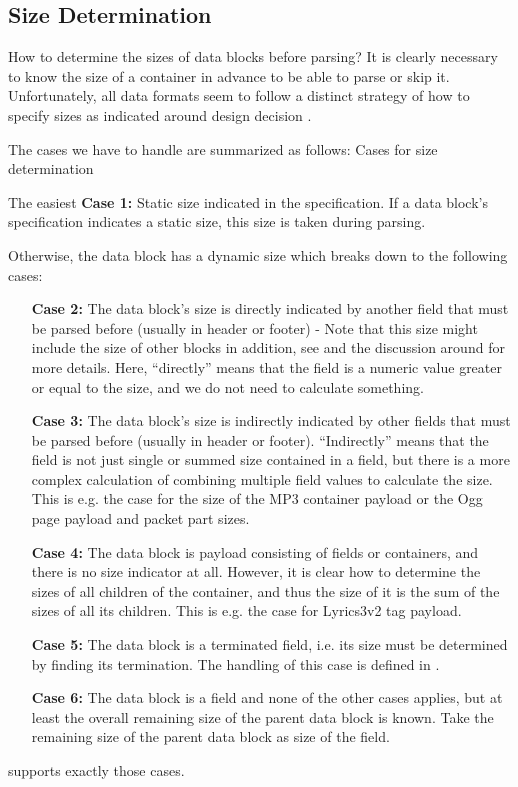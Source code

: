 \subsection{Size Determination}%
\label{sec:SizeDetermination}%

How to determine the sizes of data blocks before parsing? It is clearly necessary to know the size of a container in advance to be able to parse or skip it. Unfortunately, all data formats seem to follow a distinct strategy of how to specify sizes as indicated around design decision .

The cases we have to handle are summarized as follows:
{%
Cases for size determination
}
{%
  The easiest \textbf{Case 1:} Static size indicated in the specification. If a data block's specification indicates a static size, this size is taken during parsing.

  Otherwise, the data block has a dynamic size which breaks down to the following cases:
  \begin{enumerate}
  \item[\textbf{Case 2:}] The data block's size is directly indicated by another field that must be parsed before (usually in header or footer) - Note that this size might include the size of other blocks in addition, see  and the discussion around for more details. Here, ``directly'' means that the field is a numeric value greater or equal to the size, and we do not need to calculate something.
  \item[\textbf{Case 3:}] The data block's size is indirectly indicated by other fields that must be parsed before (usually in header or footer). ``Indirectly'' means that the field is not just single or summed size contained in a field, but there is a more complex calculation of combining multiple field values to calculate the size. This is e.g. the case for the size of the MP3 container payload or the Ogg page payload and packet part sizes.
  \item[\textbf{Case 4:}] The data block is payload consisting of fields or containers, and there is no size indicator at all. However, it is clear how to determine the sizes of all children of the container, and thus the size of it is the sum of the sizes of all its children. This is e.g. the case for Lyrics3v2 tag payload.  
  \item[\textbf{Case 5:}] The data block is a terminated field, i.e. its size must be determined by finding its termination. The handling of this case is defined in .
  \item[\textbf{Case 6:}] The data block is a field and none of the other cases applies, but at least the overall remaining size of the parent data block is known. Take the remaining size of the parent data block as size of the field.
  \end{enumerate}

  \LibName{} supports exactly those cases.
}
